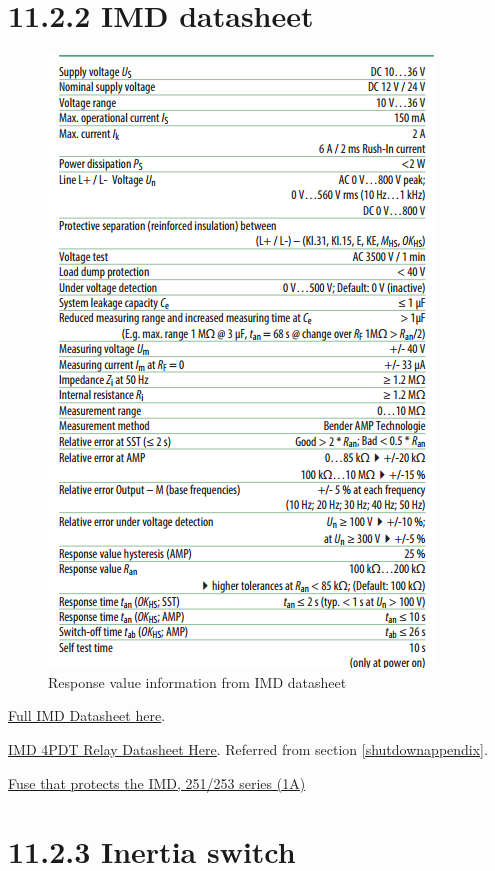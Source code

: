 \documentclass{article}
\begin{document}
\section*{11.2.2 IMD datasheet} \label{imdappendix}
\begin{figure}[H]
    \centering
    \includegraphics[width=0.45 \textheight]{IMD_datasheet_snip}
    \caption{Response value information from IMD datasheet}
    \label{IMDresponsetime}
\end{figure}

\href{http://www.bender.org/documents/IR155-10_datasheet_NAE1012821.pdf}{Full IMD Datasheet here}.

\href{http://www.automationdirect.com/static/specs/78relays.pdf}{IMD 4PDT Relay Datasheet Here}. Referred from section \ref{shutdownappendix}.

\href{http://www.littelfuse.com/~/media/electronics/datasheets/fuses/littelfuse_fuse_251_253_datasheet.pdf.pdf}{Fuse that protects the IMD, 251/253 series (1A)}

\section*{11.2.3 Inertia switch} \label{inertiaappendix}
\end{document}
